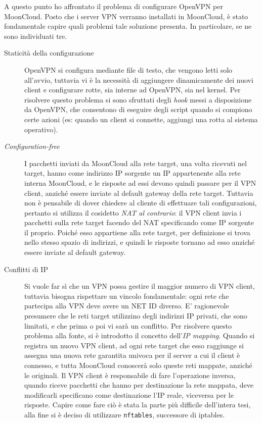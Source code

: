 \documentclass[10pt,a4paper]{article}
\begin{document}
        A questo punto ho affrontato il problema di configurare OpenVPN per
        MoonCloud. Posto che i server VPN verranno installati in MoonCloud, è stato
        fondamentale capire quali problemi tale soluzione
        presenta. In particolare, se ne sono individuati tre.
        \begin{description}
            \item[Staticità della configurazione]OpenVPN si configura mediante
            file di testo, che vengono letti solo all'avvio, tuttavia vi è la necessità
            di aggiungere dinamicamente dei nuovi client e configurare
            rotte, sia interne ad OpenVPN, sia nel kernel.
            Per risolvere questo problema
            si sono sfruttati degli \textit{hook} messi a disposizione da OpenVPN, che
            consentono di eseguire degli script quando si compiono certe azioni
            (es: quando un client si connette, aggiungi una rotta al sistema operativo).
            \item[\textit{Configuration-free}]I pacchetti inviati da MoonCloud alla rete
            target, una volta ricevuti nel target, hanno come indirizzo IP sorgente un IP appartenente
            alla rete interna MoonCloud, e le risposte ad essi devono quindi passare
            per il VPN client, anziché essere inviate al default gateway della rete target.
            Tuttavia non è pensabile di dover chiedere al cliente di effettuare tali configurazioni,
            pertanto si utilizza il cosidetto \textit{NAT al contrario}: il VPN
            client invia i pacchetti sulla rete target facendo del NAT specificando come IP sorgente
            il proprio. Poiché esso appartiene alla rete target, per definizione si trova
            nello stesso spazio di indirizzi, e quindi le risposte tornano ad esso anziché essere
            inviate al default gateway.
            \item[Conflitti di IP]Si vuole far sì che un VPN possa gestire il maggior numero
            di VPN client, tuttavia bisogna rispettare un vincolo fondamentale: ogni rete che
            partecipa alla VPN deve avere un NET ID diverso. E' ragionevole presumere che
            le reti target utilizzino degli indirizzi IP privati, che sono limitati, e che prima
            o poi vi sarà un conflitto. Per risolvere questo problema alla fonte, si è introdotto
            il concetto dell'\textit{IP mapping}. Quando si registra un nuovo VPN client, ad ogni
            rete target che esso raggiunge si assegna una nuova rete garantita univoca per
            il server a cui il client è connesso, e tutta MoonCloud conoscerà solo queste
            reti mappate, anziché le originali.
            Il VPN client è responsabile di fare l'operazione inversa, quando riceve pacchetti
            che hanno per destinazione la rete mappata, deve modificarli specificano come
            destinazione l'IP reale, viceversa per le risposte.
            Capire come fare ciò è stata la parte più difficile dell'intera tesi, alla fine
            si è deciso di utilizzare \texttt{nftables}, successore di iptables.
        \end{description}
\end{document}
